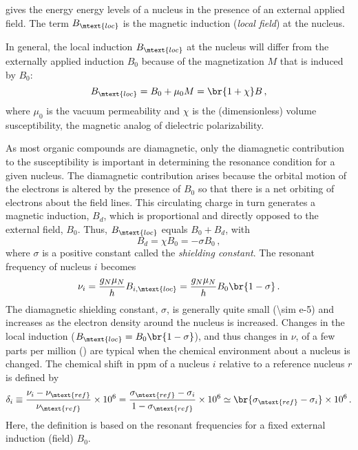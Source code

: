 \documentclass[nobib,nofonts,nols,nohyper,draft]{tufte-handout}
\begin{document}
 gives the energy energy levels of a nucleus in the presence of an external applied field. 
The term \( B_\mtext{loc} \) is the magnetic induction (\emph{local field}) at the nucleus. 

In general, the local induction \( B_\mtext{loc} \) at the nucleus will differ from the externally applied induction \( B_0 \) because of the magnetization \( M \) that is induced by \( B_0 \):
\begin{equation}
	B_\mtext{loc} = B_0 + \mu_0 M = \br{1 + \chi} B \, ,
	\label{eq:b_loc}
\end{equation}
where \( \mu_0 \) is the vacuum permeability and \( \chi \) is the (dimensionless) volume susceptibility, the magnetic analog of dielectric polarizability. 

As most organic compounds are diamagnetic, only the diamagnetic contribution to the susceptibility is important in determining the resonance condition for a given nucleus. 
The diamagnetic contribution arises because the orbital motion of the electrons is altered by the presence of \( B_0 \) so that there is a net orbiting of electrons about the field lines. 
This circulating charge in turn generates a magnetic induction, \( B_d \), which is proportional and directly opposed to the external field, \( B_0 \). 
Thus, \( B_\mtext{loc} \) equals \( B_0 + B_d \), with
\begin{equation}
	B_d = \chi B_0 = -\sigma B_0 \, ,
	\label{eq:B_dia}
\end{equation}
where \( \sigma \) is a positive constant called the \emph{shielding constant}. 
The resonant frequency of nucleus \( i \) becomes 
\begin{equation}
	\nu_i = \frac{g_N \mu_N}{h} B_{i, \mtext{loc}} = \frac{g_N \mu_N}{h} B_0 \br{1 - \sigma} \, .
	\label{eq:chem_shift}
\end{equation} 
The diamagnetic shielding constant, \( \sigma \), is generally quite small (\num{\sim e-5}) and increases as the electron density around the nucleus is increased. 
Changes in the local induction (\( B_\mtext{loc} = B_0 \br{1 - \sigma} \)), and thus changes in \( \nu \), of a few parts per million (\si{\ppm}) are typical when the chemical environment about a nucleus is changed. 
The chemical shift in \si{ppm} of a nucleus \( i \) relative to a reference nucleus \( r \) is defined by 
\begin{equation}
	\delta_{i} \equiv 
		\frac{\nu_{i}-\nu_\mtext{ref}}{\nu_\mtext{ref}} \times 10^6 = 
		\frac{\sigma_\mtext{ref} - \sigma_i}{1 - \sigma_\mtext{ref}} \times 10^6 \simeq 
		\br{\sigma_\mtext{ref} - \sigma_i} \times 10^6 \, .
		\label{eq:chem_shift_delta}
\end{equation}
Here, the definition is based on the resonant frequencies for a fixed external induction (field) \( B_0 \). 
\end{document}
